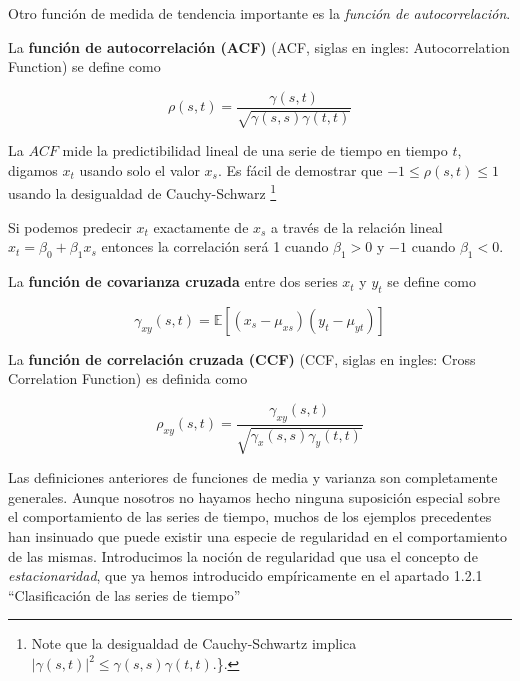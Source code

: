 \documentclass[12pt,]{krantz}
\theoremstyle{definition}
\theoremstyle{definition}
\theoremstyle{definition}
\theoremstyle{remark}
\let\BeginKnitrBlock\begin \let\EndKnitrBlock\end
\begin{document}
Otro función de medida de tendencia importante es la \emph{función de
autocorrelación}.

\BeginKnitrBlock{definition}
\protect\hypertarget{def:defi-acf}{}{\label{def:defi-acf} }La
\textbf{función de autocorrelación (ACF)} (ACF, siglas en ingles:
Autocorrelation Function) se define como

\begin{equation}
\rho(s,t)=\frac{\gamma(s,t)}{\sqrt{\gamma(s,s)\gamma(t,t)}}
\label{eq:eq-funcion-autocorrelacion}
\end{equation}
\EndKnitrBlock{definition}

La \(ACF\) mide la predictibilidad lineal de una serie de tiempo en
tiempo \(t\), digamos \(x_t\) usando solo el valor \(x_s\). Es fácil de
demostrar que \(-1\leq\rho(s,t)\leq1\) usando la desigualdad de
Cauchy-Schwarz \footnote{Note que la desigualdad de Cauchy-Schwartz
  implica \(|\gamma(s,t)|^2\leq\gamma(s,s)\gamma(t,t)\).\}.}

Si podemos predecir \(x_t\) exactamente de \(x_s\) a través de la
relación lineal \(x_t=\beta_0+\beta_1x_s\) entonces la correlación será
1 cuando \(\beta_1>0\) y \(-1\) cuando \(\beta_1<0\).

\BeginKnitrBlock{definition}
\protect\hypertarget{def:defi-covarianza-cruzada}{}{\label{def:defi-covarianza-cruzada}
}La \textbf{función de covarianza cruzada} entre dos series \(x_t\) y
\(y_t\) se define como

\begin{equation}
\gamma_{xy}(s,t)=\mathbb{E}[(x_s-\mu_{xs})(y_t-\mu_{yt})]
\label{eq:eq-funcion-covarianza-cruzada}
\end{equation}
\EndKnitrBlock{definition}

\BeginKnitrBlock{definition}
\protect\hypertarget{def:defi-ccf}{}{\label{def:defi-ccf} }La
\textbf{función de correlación cruzada (CCF)} (CCF, siglas en ingles:
Cross Correlation Function) es definida como

\begin{equation}
\rho_{xy}(s,t)=\frac{\gamma_{xy}(s,t)}{\sqrt{\gamma_x(s,s)\gamma_y(t,t)}}
\label{eq:eq-funcion-correlacion-cruzada}
\end{equation}
\EndKnitrBlock{definition}

Las definiciones anteriores de funciones de media y varianza son
completamente generales. Aunque nosotros no hayamos hecho ninguna
suposición especial sobre el comportamiento de las series de tiempo,
muchos de los ejemplos precedentes han insinuado que puede existir una
especie de regularidad en el comportamiento de las mismas. Introducimos
la noción de regularidad que usa el concepto de \emph{estacionaridad},
que ya hemos introducido empíricamente en el apartado 1.2.1
``Clasificación de las series de tiempo''
\end{document}
